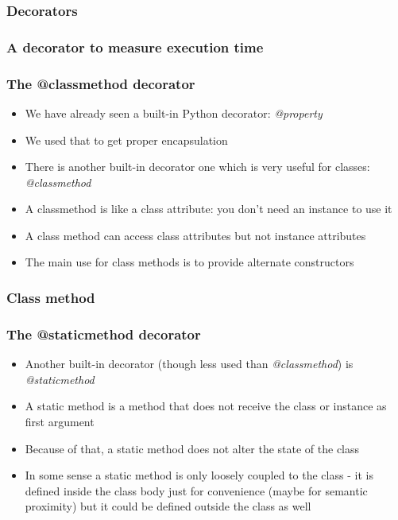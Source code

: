 \documentclass[9pt]{beamer}
\begin{document}
\begin{frame}
  \frametitle{Decorators}
  
\end{frame}


\begin{frame}
  \frametitle{A decorator to measure execution time}
  
\end{frame}


\begin{frame}
  \frametitle{The @classmethod decorator}
  \begin{itemize}
    \item We have already seen a built-in Python decorator: \emph{@property}
    \item We used that to get proper encapsulation
    \item There is another built-in decorator one which is very useful for classes: \alert{\emph{@classmethod}}
    \item A classmethod is like a class attribute: you don't need an instance to
          use it
    \item A class method can access class attributes but not instance attributes
    \item The main use for class methods is to provide \alert{alternate constructors}
  \end{itemize}
\end{frame}


\begin{frame}
  \frametitle{Class method}
  
\end{frame}


\begin{frame}
  \frametitle{The @staticmethod decorator}
  \begin{itemize}
    \item Another built-in decorator (though less used than \emph{@classmethod})
          is \alert{\emph{@staticmethod}}
    \smallskip
    \item A static method is a method that does not receive the class or instance
          as first argument
    \smallskip
    \item Because of that, a static method does not alter the state of the class
    \smallskip
    \item In some sense a static method is only loosely coupled to the class - 
          it is defined inside the class body just for convenience (maybe for
          semantic proximity) but it could be defined outside the class as well
  \end{itemize}
\end{frame}
\end{document}
